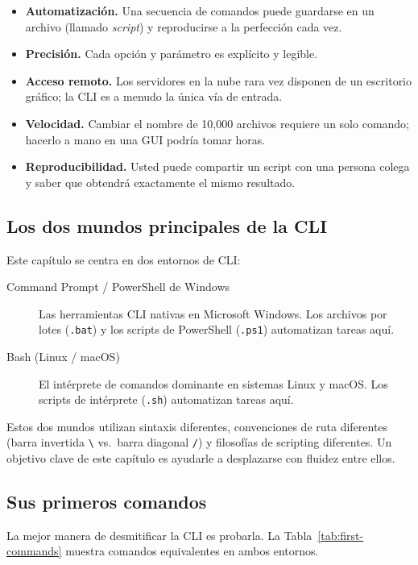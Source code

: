 \begin{itemize}
  \item \textbf{Automatización.} Una secuencia de comandos puede guardarse
        en un archivo (llamado \emph{script}) y reproducirse a la perfección
        cada vez.
  \item \textbf{Precisión.} Cada opción y parámetro es explícito y legible.
  \item \textbf{Acceso remoto.} Los servidores en la nube rara vez disponen
        de un escritorio gráfico; la CLI es a menudo la única vía de entrada.
  \item \textbf{Velocidad.} Cambiar el nombre de 10{,}000 archivos requiere
        un solo comando; hacerlo a mano en una GUI podría tomar horas.
  \item \textbf{Reproducibilidad.} Usted puede compartir un script con una
        persona colega y saber que obtendrá exactamente el mismo resultado.
\end{itemize}

\subsection{Los dos mundos principales de la CLI}

Este capítulo se centra en dos entornos de CLI:

\begin{description}
  \item[Command Prompt / PowerShell de Windows] Las herramientas CLI nativas
        en Microsoft Windows. Los archivos por lotes (\texttt{.bat}) y los
        scripts de PowerShell (\texttt{.ps1}) automatizan tareas aquí.
  \item[Bash (Linux / macOS)] El intérprete de comandos dominante en
        sistemas Linux y macOS. Los scripts de intérprete (\texttt{.sh})
        automatizan tareas aquí.
\end{description}

Estos dos mundos utilizan sintaxis diferentes, convenciones de ruta diferentes
(barra invertida \texttt{\textbackslash} vs.\ barra diagonal \texttt{/}) y
filosofías de scripting diferentes. Un objetivo clave de este capítulo es
ayudarle a desplazarse con fluidez entre ellos.

\subsection{Sus primeros comandos}

La mejor manera de desmitificar la CLI es probarla. La
Tabla~\ref{tab:first-commands} muestra comandos equivalentes en ambos
entornos.

